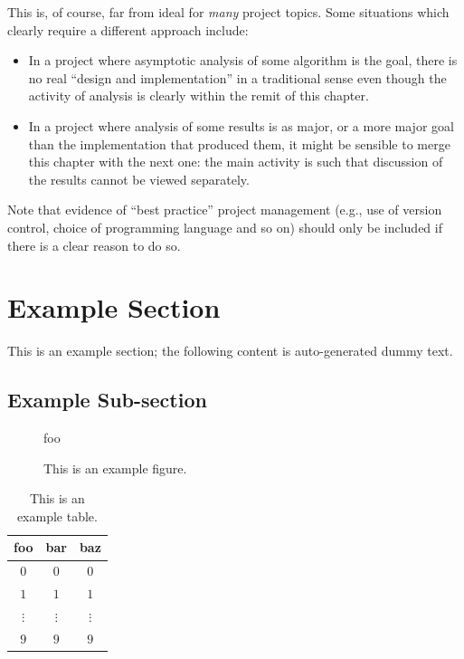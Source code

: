 \documentclass[ %
                    author={Sam Phippen},
                supervisor={Dr. Rafal Bogacz},
                     title={Real time voice activity detectors in noisy personal computing environments},
                  subtitle={},
                    degree={MEng},
                      year={2012} ]{thesis}
\begin{document}
This is, of course, far from ideal for {\em many} project topics.  Some
situations which clearly require a different approach include:

\begin{itemize}
\item In a project where asymptotic analysis of some algorithm is the goal,
      there is no real ``design and implementation'' in a traditional sense
      even though the activity of analysis is clearly within the remit of
      this chapter.
\item In a project where analysis of some results is as major, or a more
      major goal than the implementation that produced them, it might be
      sensible to merge this chapter with the next one: the main activity 
      is such that discussion of the results cannot be viewed separately.
\end{itemize}

\noindent
Note that evidence of ``best practice'' project management (e.g., use of 
version control, choice of programming language and  so on) should only 
be included if there is a clear reason to do so.

\section{Example Section}

This is an example section; 
the following content is auto-generated dummy text.
\lipsum

\subsection{Example Sub-section}

\begin{figure}[t]
\centering
foo
\caption{This is an example figure.}
\label{fig}
\end{figure}

\begin{table}[t]
\centering
\begin{tabular}{|cc|c|}
\hline
foo      & bar      & baz      \\
\hline
$0     $ & $0     $ & $0     $ \\
$1     $ & $1     $ & $1     $ \\
$\vdots$ & $\vdots$ & $\vdots$ \\
$9     $ & $9     $ & $9     $ \\
\hline
\end{tabular}
\caption{This is an example table.}
\label{tab}
\end{table}
\end{document}
